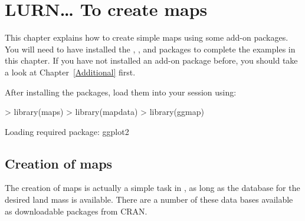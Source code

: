



\chapter{LURN\ldots{} To create maps} 
\label{Maps} 
 



 
This chapter explains how to create simple maps using some add-on packages. You will need to have installed the , , and   packages to complete the examples in this chapter. If you have not installed an add-on package before, you should take a look at Chapter~\ref{Additional} first. 
 
After installing the packages, load them into your \R{} session using: 

\begin{Schunk}
\begin{Sinput}
> library(maps) 
> library(mapdata) 
> library(ggmap) 
\end{Sinput}
\begin{Soutput}
Loading required package: ggplot2
\end{Soutput}
\end{Schunk}

 
\section{Creation of maps} 
 
The creation of maps is actually a simple task in \R{}, as long as the database for the desired land mass is available. There are a number of these data bases available as downloadable packages from CRAN. 
 
